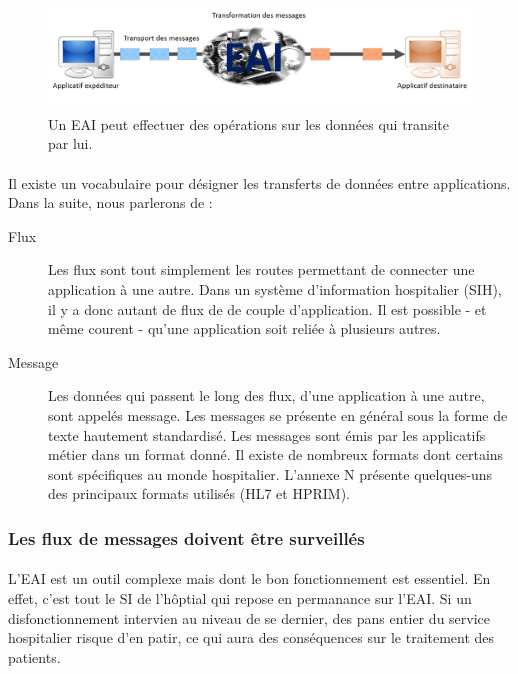 			\begin{figure}
				\centering
				\includegraphics[width=15cm]{../img/eai_2.png}
				\caption{\label{Figure 2} Un EAI peut effectuer des opérations sur les
				données qui transite par lui.}
			\end{figure}
			
			\paragraph{}%
 			Il existe un vocabulaire pour désigner les transferts de données entre
 			applications. Dans la suite, nous parlerons de :
 			\begin{description}
 				\item[Flux] Les flux sont tout simplement les routes permettant de
 				connecter une application à une autre. Dans un système d'information hospitalier
 				(SIH), il y a donc autant de flux de de couple d'application. Il est
 				possible - et même courent - qu'une application soit reliée à plusieurs
 				autres.
 				\item[Message] Les données qui passent le long des flux, d'une application
 				à une autre, sont appelés message. Les messages se présente en général sous
 				la forme de texte hautement standardisé. Les messages sont émis par les
 				applicatifs métier dans un format donné. Il existe de nombreux formats
 				dont certains sont spécifiques au monde hospitalier. L'annexe N présente
 				quelques-uns des principaux formats utilisés (HL7 et HPRIM).
 			\end{description}
		\subsubsection{Les flux de messages doivent être surveillés}
			\paragraph{}%
			L'EAI est un outil complexe mais dont le bon fonctionnement est essentiel. En
			effet, c'est tout le SI de l'hôptial qui repose en permanance sur l'EAI. Si
			un disfonctionnement intervien au niveau de se dernier, des pans entier du
			service hospitalier risque d'en patir, ce qui aura des conséquences sur le
			traitement des patients.

